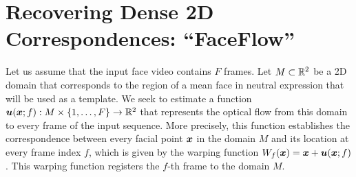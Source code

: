 \section{Recovering Dense 2D Correspondences: ``FaceFlow''}\label{sec:face_flow_method}
Let us assume that the input face video contains $F$ frames. Let $M\subset\mathbb{R}^2$
be a 2D domain that corresponds to the region of a mean face in neutral expression
that will be used as a template. We seek to estimate a function
$\boldsymbol{u}(\boldsymbol{x};f) : M\times \{1,\ldots,F\} \rightarrow \mathbb{R}^2$ that represents the
optical flow from this domain to every frame of the input sequence.
More precisely, this function establishes the correspondence between every
facial point $\boldsymbol{x}$ in the domain $M$ and its location at every frame index $f$,
which is given by the warping function $W_f(\boldsymbol{x})=\boldsymbol{x}+\boldsymbol{u}(\boldsymbol{x};f)$. This warping
function registers the $f$-th frame to the domain $M$.

